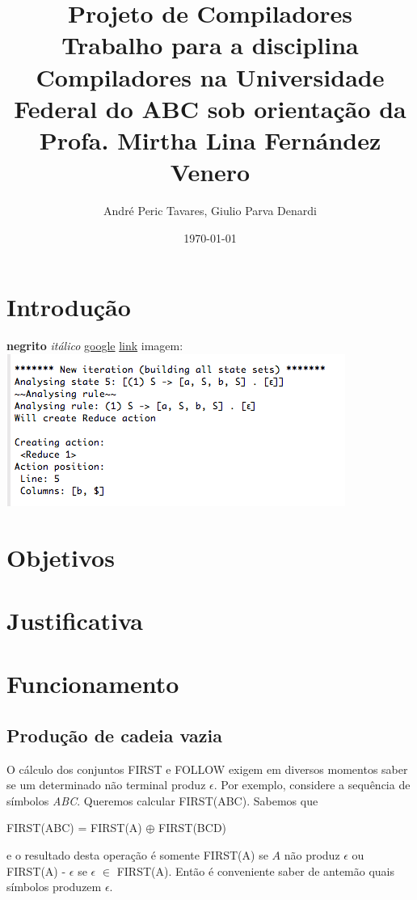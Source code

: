 \documentclass[11pt]{article}
\author{André Peric Tavares, Giulio Parva Denardi}
\date{\today}
\title{Projeto de Compiladores\\\medskip
\large Trabalho para a disciplina Compiladores na Universidade Federal do ABC sob orientação da Profa. Mirtha Lina Fernández Venero}
\begin{document}
\maketitle
\tableofcontents


\section{Introdução}
\label{sec:orgheadline1}
\textbf{negrito}
\emph{itálico}
\href{https://google.com}{google}
\hyperref[sec:orgheadline1]{link}
imagem:
\includegraphics[width=.9\linewidth]{./media/Screenshot 2016-04-25 17.54.18.png}

\section{Objetivos}
\label{sec:orgheadline2}
\section{Justificativa}
\label{sec:orgheadline3}
\section{Funcionamento}
\label{sec:orgheadline12}
\subsection{Produção de cadeia vazia}
\label{sec:orgheadline4}
O cálculo dos conjuntos FIRST e FOLLOW exigem em diversos momentos saber se
um determinado não terminal produz \(\epsilon\). Por exemplo, considere a sequência
de símbolos \emph{ABC}. Queremos calcular FIRST(ABC). Sabemos que

\begin{center}
FIRST(ABC) = FIRST(A) \(\oplus\) FIRST(BCD)
\end{center}

e o resultado desta operação é somente FIRST(A) se \(A\) não produz \(\epsilon\) ou
FIRST(A) - \(\epsilon\) se \(\epsilon\) \(\in\) FIRST(A). Então é conveniente saber de
antemão quais símbolos produzem \(\epsilon\).
\end{document}
